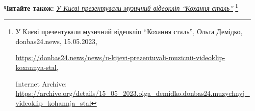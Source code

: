  
 
 
 
 

\textbf{Читайте також:} \href{https://archive.org/details/15_05_2023.olga_demidko.donbas24.muzychnyj_videoklip_kohannja_stal}{\emph{У Києві презентували музичний відеокліп \enquote{Кохання сталь}}}%
\footnote{У Києві презентували музичний відеокліп \enquote{Кохання сталь}, Ольга Демідко, donbas24.news, 15.05.2023, \par%
\url{https://donbas24.news/news/u-kijevi-prezentuvali-muzicnii-videoklip-koxannya-stal}, \par%
Internet Archive: \url{https://archive.org/details/15_05_2023.olga_demidko.donbas24.muzychnyj_videoklip_kohannja_stal}%
}
